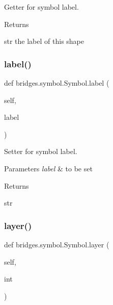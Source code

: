 Getter for symbol label. 

\begin{DoxyReturn}{Returns}


str the label of this shape 
\end{DoxyReturn}
\mbox{\label{classbridges_1_1symbol_1_1_symbol_a44d41804267e94598d0a29ca1a29c3b1}} 
\subsubsection{\texorpdfstring{label()}{label()}\hspace{0.1cm}{\footnotesize\ttfamily [2/2]}}
{\footnotesize\ttfamily def bridges.\+symbol.\+Symbol.\+label (\begin{DoxyParamCaption}\item[{}]{self,  }\item[{}]{label }\end{DoxyParamCaption})}



Setter for symbol label. 


\begin{DoxyParams}{Parameters}
{\em label} & to be set \\
\hline
\end{DoxyParams}
\begin{DoxyReturn}{Returns}


str 
\end{DoxyReturn}
\mbox{\label{classbridges_1_1symbol_1_1_symbol_a87aeef3f7fde1b8047983ca344283507}} 
\subsubsection{\texorpdfstring{layer()}{layer()}\hspace{0.1cm}{\footnotesize\ttfamily [1/2]}}
{\footnotesize\ttfamily def bridges.\+symbol.\+Symbol.\+layer (\begin{DoxyParamCaption}\item[{}]{self,  }\item[{}]{int }\end{DoxyParamCaption})}

